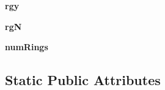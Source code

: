 \begin{DoxyCompactItemize}
\item 
\hypertarget{classmyDetector_1_1myDetector_ad5f3334a490e58278f087ae41ee0209d}{{\bfseries rgy}}\label{classmyDetector_1_1myDetector_ad5f3334a490e58278f087ae41ee0209d}

\item 
\hypertarget{classmyDetector_1_1myDetector_a8fc457a95899e9381b9b5174e65830c1}{{\bfseries rg\-N}}\label{classmyDetector_1_1myDetector_a8fc457a95899e9381b9b5174e65830c1}

\item 
\hypertarget{classmyDetector_1_1myDetector_a05f2425814f187134ce753369bb324ad}{{\bfseries num\-Rings}}\label{classmyDetector_1_1myDetector_a05f2425814f187134ce753369bb324ad}

\end{DoxyCompactItemize}
\subsection*{Static Public Attributes}
